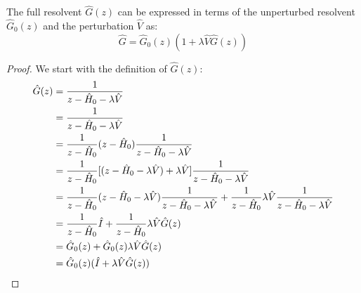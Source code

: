 \begin{proposition}
    The full resolvent $\hat G(z)$ can be expressed in terms of the
    unperturbed resolvent $\hat G_0(z)$ and the perturbation $\hat V$ as:
    \begin{equation} \label{eq:dyson_equation}
        \hat G=\hat G_0(z)(1+\lambda \hat V \hat G(z))
    \end{equation}
\end{proposition}
\begin{proof}
    We start with the definition of $\hat G(z)$:
    \begin{align} \label{eq:dyson_derivation}
        \hat G(z) &= \frac{1}{z - \hat H_0 - \lambda \hat V} \\
        &= \frac{1}{z - \hat H_0 - \lambda \hat V} \notag \\
        &= \frac{1}{z - \hat H_0} (z - \hat H_0) \frac{1}{z - \hat
        H_0 - \lambda \hat V} \notag \\
        &= \frac{1}{z - \hat H_0} [(z - \hat H_0 - \lambda \hat V) +
        \lambda \hat V] \frac{1}{z - \hat H_0 - \lambda \hat V} \notag \\
        &= \frac{1}{z - \hat H_0} (z - \hat H_0 - \lambda \hat V)
        \frac{1}{z - \hat H_0 - \lambda \hat V} + \frac{1}{z - \hat
        H_0} \lambda \hat V \frac{1}{z - \hat H_0 - \lambda \hat V} \notag \\
        &= \frac{1}{z - \hat H_0} \hat I + \frac{1}{z - \hat H_0}
        \lambda \hat V \hat G(z) \notag \\
        &= \hat G_0(z) + \hat G_0(z) \lambda \hat V \hat G(z) \notag \\
        &= \hat G_0(z) ( \hat I + \lambda \hat V \hat G(z) ) \notag
    \end{align}
\end{proof}

